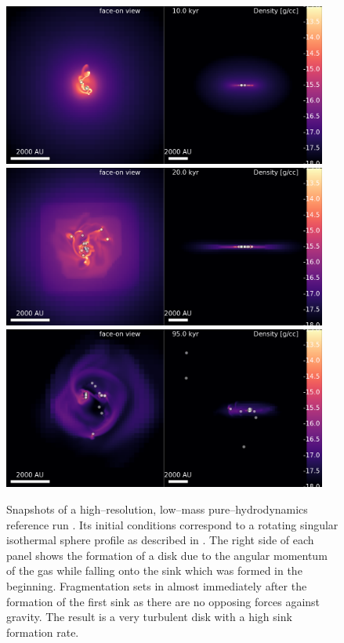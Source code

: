 \begin{figure}[!htb]
 \centering
 \includegraphics[width=0.95\textwidth]{Figures/hydro_pure/pure_hydro_1}
 \includegraphics[width=0.95\textwidth]{Figures/hydro_pure/pure_hydro_2}
 \includegraphics[width=0.95\textwidth]{Figures/hydro_pure/pure_hydro_3}
 \captionsetup{justification=justified,singlelinecheck=false,width=\linewidth}
 \decoRule
 \caption[Hydrodynamical isothermal sphere collapse]{Snapshots of a high--resolution, low--mass pure--hydrodynamics reference run .
                                                     Its initial conditions correspond to a rotating singular isothermal sphere profile as described in .
                                                     The right side of each panel shows the formation of a disk due to the angular momentum of the gas while falling onto the sink which was formed in the beginning.
                                                     Fragmentation sets in almost immediately after the formation of the first sink as there are no opposing forces against gravity.
                                                     The result is a very turbulent disk with a high sink formation rate.}
\label{fig:hydro_purePt2}
\end{figure}
\FloatBarrier

